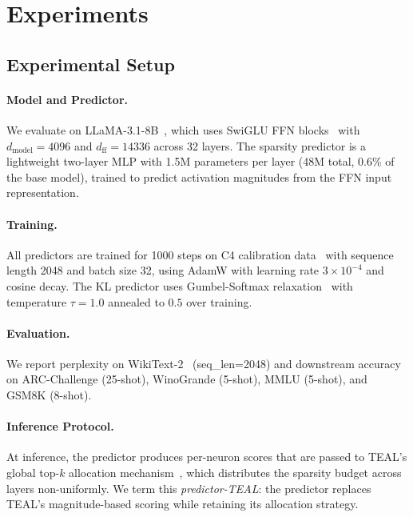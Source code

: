 \section{Experiments}

\subsection{Experimental Setup}

\paragraph{Model and Predictor.}
We evaluate on LLaMA-3.1-8B~\cite{grattafiori2024llama3}, which uses SwiGLU FFN blocks~\cite{shazeer2020glu} with $d_{\text{model}}=4096$ and $d_{\text{ff}}=14336$ across 32 layers.
The sparsity predictor is a lightweight two-layer MLP with 1.5M parameters per layer (48M total, 0.6\% of the base model), trained to predict activation magnitudes from the FFN input representation.

\paragraph{Training.}
All predictors are trained for 1000 steps on C4 calibration data~\cite{raffel2020t5} with sequence length 2048 and batch size 32, using AdamW with learning rate $3 \times 10^{-4}$ and cosine decay.
The KL predictor uses Gumbel-Softmax relaxation~\cite{jang2017gumbel} with temperature $\tau=1.0$ annealed to $0.5$ over training.

\paragraph{Evaluation.}
We report perplexity on WikiText-2~\cite{merity2017pointer} (seq\_len=2048) and downstream accuracy on ARC-Challenge (25-shot), WinoGrande (5-shot), MMLU (5-shot), and GSM8K (8-shot).

\paragraph{Inference Protocol.}
At inference, the predictor produces per-neuron scores that are passed to TEAL's global top-$k$ allocation mechanism~\cite{liu2025teal}, which distributes the sparsity budget across layers non-uniformly.
We term this \textit{predictor-TEAL}: the predictor replaces TEAL's magnitude-based scoring while retaining its allocation strategy.

